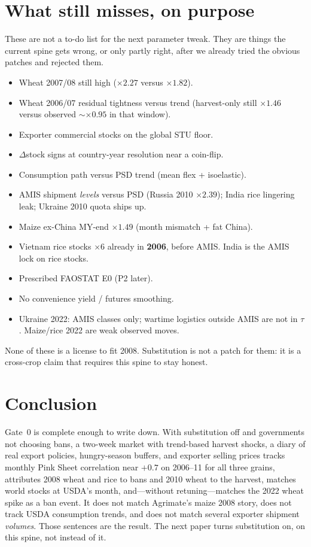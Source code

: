 \documentclass[11pt,a4paper]{article}
\begin{document}
\section{What still misses, on purpose}
\label{sec:leftovers}

These are not a to-do list for the next parameter tweak. They are things
the current spine gets wrong, or only partly right, after we already tried
the obvious patches and rejected them.

\begin{itemize}
\item Wheat 2007/08 still high ($\times 2.27$ versus $\times 1.82$).
\item Wheat 2006/07 residual tightness versus trend (harvest-only still
      $\times 1.46$ versus observed $\sim\times 0.95$ in that window).
\item Exporter commercial stocks on the global STU floor.
\item $\Delta$stock signs at country-year resolution near a coin-flip.
\item Consumption path versus PSD trend (mean flex + isoelastic).
\item AMIS shipment \emph{levels} versus PSD (Russia 2010 $\times 2.39$);
      India rice lingering leak; Ukraine 2010 quota ships up.
\item Maize ex-China MY-end $\times 1.49$ (month mismatch + fat China).
\item Vietnam rice stocks $\times 6$ already in \textbf{2006}, before AMIS.
      India is the AMIS lock on rice stocks.
\item Prescribed FAOSTAT E0 (P2 later).
\item No convenience yield / futures smoothing.
\item Ukraine 2022: AMIS classes only; wartime logistics outside AMIS are
      not in $\tau$. Maize/rice 2022 are weak observed moves.
\end{itemize}

None of these is a license to fit 2008. Substitution is not a patch for
them: it is a cross-crop claim that requires this spine to stay honest.

\section{Conclusion}
\label{sec:conc}

Gate~0 is complete enough to write down. With substitution off and
governments not choosing bans, a two-week market with trend-based harvest
shocks, a diary of real export policies, hungry-season buffers, and
exporter selling prices tracks monthly Pink Sheet correlation near $+0.7$
on 2006--11 for all three grains, attributes 2008 wheat and rice to bans
and 2010 wheat to the harvest, matches world stocks at USDA's month,
and---without retuning---matches the 2022 wheat spike as a ban event. It
does not match Agrimate's maize 2008 story, does not track USDA
consumption trends, and does not match several exporter shipment
\emph{volumes}. Those sentences are the result. The next paper turns
substitution on, on this spine, not instead of it.

\appendix



\end{document}

